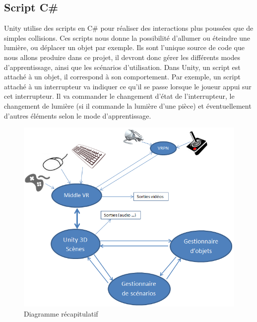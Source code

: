 \subsection{Script C\#}
Unity utilise des scripts en C\# pour réaliser des interactions plus poussées que de simples collisions. Ces scripts nous donne la possibilité d'allumer ou éteindre une lumière, ou déplacer un objet par exemple. Ils sont l'unique source de code que nous allons produire dans ce projet, il devront donc gérer les différents modes d'apprentissage, ainsi que les scénarios d'utilisation.
Dans Unity, un script est attaché à un objet, il correspond à son comportement. Par exemple, un script attaché à un interrupteur va indiquer ce qu'il se passe lorsque le joueur appui sur cet interrupteur. Il va commander le changement d'état de l'interrupteur, le changement de lumière (si il commande la lumière d'une pièce) et éventuellement d'autres éléments selon le mode d'apprentissage.
\begin{figure}[h]
\centering
\includegraphics[width=1\textwidth]{4-conception/img/recap.png}
\caption{ Diagramme récapitulatif }
\end{figure}
